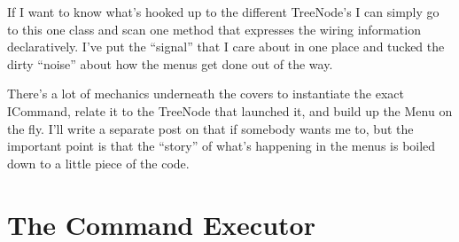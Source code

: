 \documentclass{article}
\begin{document}
{If I want to know what's hooked up to the different TreeNode's I can simply go to this one class and scan one method that expresses the wiring information declaratively.  I've put the “signal” that I care about in one place and tucked the dirty “noise” about how the menus get done out of the way. 

There's a lot of mechanics underneath the covers to instantiate the exact ICommand, relate it to the TreeNode that launched it, and build up the Menu on the fly.  I'll write a separate post on that if somebody wants me to, but the important point is that the “story” of what's happening in the menus is boiled down to a little piece of the code.  

\section{ The Command Executor } 

}
\end{document}
